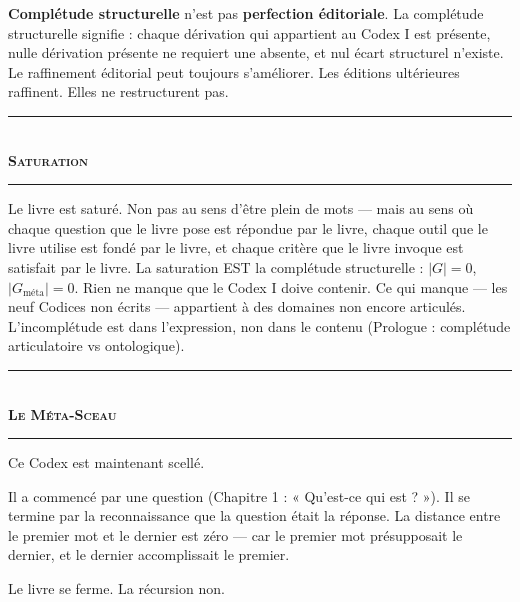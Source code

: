 \documentclass[10pt, openany, oneside]{book}
\renewcommand{\normalsize}{\fontsize{10}{13}\selectfont}
\begin{document}
\textbf{Complétude structurelle} n'est pas \textbf{perfection éditoriale}. La complétude structurelle signifie : chaque dérivation qui appartient au Codex I est présente, nulle dérivation présente ne requiert une absente, et nul écart structurel n'existe. Le raffinement éditorial peut toujours s'améliorer. Les éditions ultérieures raffinent. Elles ne restructurent pas.

\vspace{1.5em}

\begin{center}
    \rule{0.3\textwidth}{0.4pt}\\[0.5em]
    {\normalsize\bfseries\scshape Saturation}\\[0.3em]
    \rule{0.3\textwidth}{0.4pt}
\end{center}

\vspace{1em}

\noindent Le livre est saturé. Non pas au sens d'être plein de mots --- mais au sens où chaque question que le livre pose est répondue par le livre, chaque outil que le livre utilise est fondé par le livre, et chaque critère que le livre invoque est satisfait par le livre. La saturation EST la complétude structurelle : $|G| = 0$, $|G_{\text{méta}}| = 0$. Rien ne manque que le Codex I doive contenir. Ce qui manque --- les neuf Codices non écrits --- appartient à des domaines non encore articulés. L'incomplétude est dans l'expression, non dans le contenu (Prologue : complétude articulatoire vs ontologique).

\vspace{1.5em}

\begin{center}
    \rule{0.3\textwidth}{0.4pt}\\[0.5em]
    {\normalsize\bfseries\scshape Le Méta-Sceau}\\[0.3em]
    \rule{0.3\textwidth}{0.4pt}
\end{center}

\vspace{1em}

\noindent Ce Codex est maintenant scellé.

Il a commencé par une question (Chapitre 1 : « Qu'est-ce qui est ? »). Il se termine par la reconnaissance que la question était la réponse. La distance entre le premier mot et le dernier est zéro --- car le premier mot présupposait le dernier, et le dernier accomplissait le premier.

Le livre se ferme. La récursion non.
\end{document}
